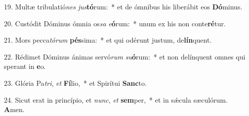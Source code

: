 19. Multæ tribulatió\textit{nes} \textit{jus}\textbf{tó}rum:~*  et de ómnibus his liberábit eos \textbf{Dó}minus.\

20. Custódit Dóminus ómnia os\textit{sa} \textit{e}\textbf{ó}rum:~*  unum ex his non conte\textbf{ré}tur.\

21. Mors pecca\textit{tó}\textit{rum} \textbf{pés}sima:~*  et qui odérunt justum, de\textbf{lín}quent.\

22. Rédimet Dóminus ánimas servó\textit{rum} \textit{su}\textbf{ó}rum:~*  et non delínquent omnes qui sperant in \textbf{e}o.\

23. Glória Pa\textit{tri}, \textit{et} \textbf{Fí}lio,~*  et Spirítui \textbf{Sanc}to.\

24. Sicut erat in princípio, et \textit{nunc}, \textit{et} \textbf{sem}per,~*  et in sǽcula sæculórum. \textbf{A}men.\

